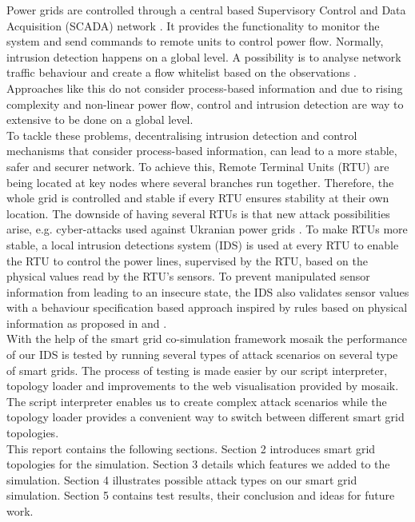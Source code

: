 \documentclass[conference]{IEEEtran}
\begin{document}
	Power grids are controlled through a central based Supervisory Control and Data Acquisition (SCADA) network \cite{chromik1}. It provides the functionality to monitor the system and send commands to remote units to control power flow. Normally, intrusion detection happens on a global level. A possibility is to analyse network traffic behaviour and create a flow whitelist based on the observations \cite{barbosa}. Approaches like this do not consider process-based information and due to rising complexity and non-linear power flow, control and intrusion detection are way to extensive to be done on a global level. \\
	To tackle these problems, decentralising intrusion detection and control mechanisms that consider process-based information, can lead to a more stable, safer and securer network. To achieve this, Remote Terminal Units (RTU) are being located at key nodes where several branches run together. Therefore, the whole grid is controlled and stable if every RTU ensures stability at their own location. The downside of having several RTUs is that new attack possibilities arise, e.g. cyber-attacks used against Ukranian power grids \cite{icscert}. To make RTUs more stable, a local intrusion detections system (IDS) is used at every RTU to enable the RTU to control the power lines, supervised by the RTU, based on the physical values read by the RTU's sensors. To prevent manipulated sensor information from leading to an insecure state, the IDS also validates sensor values with a behaviour specification based approach inspired by rules based on physical information as proposed in \cite{chromik1} and \cite{blithe}. \\
	With the help of the smart grid co-simulation framework mosaik the performance of our IDS is tested by running several types of attack scenarios on several type of smart grids. The process of testing is made easier by our script interpreter, topology loader and improvements to the web visualisation provided by mosaik. The script interpreter enables us to create complex attack scenarios while the topology loader provides a convenient way to switch between different smart grid topologies. \\
	This report contains the following sections. Section 2 introduces smart grid topologies for the simulation. Section 3 details which features we added to the simulation. Section 4 illustrates possible attack types on our smart grid simulation. Section 5 contains test results, their conclusion and ideas for future work.
\end{document}
